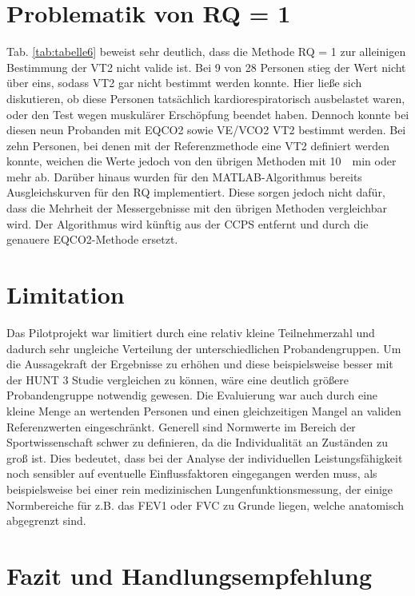 \section{Problematik von RQ = 1}

Tab. \ref{tab:tabelle6} beweist sehr deutlich, dass die Methode RQ = 1 zur alleinigen Bestimmung der VT2 nicht valide ist. Bei 9 von 28 Personen stieg der Wert nicht über eins, sodass VT2 gar nicht bestimmt werden konnte. Hier ließe sich diskutieren, ob diese Personen tatsächlich kardiorespiratorisch ausbelastet waren, oder den Test wegen muskulärer Erschöpfung beendet haben. Dennoch konnte bei diesen neun Probanden mit \acs{EQCO2} sowie \acs{VE}/\acs{VCO2} VT2 bestimmt werden. Bei zehn Personen, bei denen mit der Referenzmethode eine VT2 definiert werden konnte, weichen die Werte jedoch von den übrigen Methoden mit \SI{10}{\per\minute} oder mehr ab. Darüber hinaus wurden für den MATLAB-Algorithmus bereits Ausgleichskurven für den RQ implementiert. Diese sorgen jedoch nicht dafür, dass die Mehrheit der Messergebnisse mit den übrigen Methoden vergleichbar wird. Der Algorithmus wird künftig aus der \acs{CCPS} entfernt und durch die genauere \acs{EQCO2}-Methode ersetzt.

\section{Limitation}

Das Pilotprojekt war limitiert durch eine relativ kleine Teilnehmerzahl und dadurch sehr ungleiche Verteilung der unterschiedlichen Probandengruppen. Um die Aussagekraft der Ergebnisse zu erhöhen und diese beispielsweise besser mit der HUNT 3 Studie vergleichen zu können, wäre eine deutlich größere Probandengruppe notwendig gewesen. Die Evaluierung war auch durch eine kleine Menge an wertenden Personen und einen gleichzeitigen Mangel an validen Referenzwerten eingeschränkt. Generell sind Normwerte im Bereich der Sportwissenschaft schwer zu definieren, da die Individualität an Zuständen zu groß ist. Dies bedeutet, dass bei der Analyse der individuellen Leistungsfähigkeit noch sensibler auf eventuelle Einflussfaktoren eingegangen werden muss, als beispielsweise bei einer rein medizinischen Lungenfunktionsmessung, der einige Normbereiche für z.B. das \ac{FEV1} oder \ac{FVC} zu Grunde liegen, welche anatomisch abgegrenzt sind.

\section{Fazit und Handlungsempfehlung}

